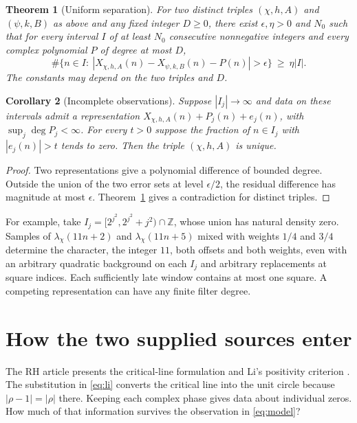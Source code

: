 \documentclass[11pt]{article}
\newtheorem{theorem}{Theorem}
\newtheorem{corollary}[theorem]{Corollary}
\newcommand{\model}{X_{\chi,h,A}}
\begin{document}
\begin{theorem}[Uniform separation]\label{thm:main}
For two distinct triples $(\chi,h,A)$ and $(\psi,k,B)$ as above and any fixed integer $D\ge0$, there exist $\epsilon,\eta>0$ and $N_0$ such that for every interval $I$ of at least $N_0$ consecutive nonnegative integers and every complex polynomial $P$ of degree at most $D$,
\[
 \#\{n\in I:\ |X_{\chi,h,A}(n)-X_{\psi,k,B}(n)-P(n)|>\epsilon\}
 \ \ge\ \eta |I|.
\]
The constants may depend on the two triples and $D$.
\end{theorem}

\begin{corollary}[Incomplete observations]\label{cor:id}
Suppose $|I_j|\to\infty$ and data on these intervals admit a representation $\model(n)+P_j(n)+e_j(n)$, with $\sup_j\deg P_j<\infty$. For every $t>0$ suppose the fraction of $n\in I_j$ with $|e_j(n)|>t$ tends to zero. Then the triple $(\chi,h,A)$ is unique.
\end{corollary}
\begin{proof}
Two representations give a polynomial difference of bounded degree. Outside the union of the two error sets at level $\epsilon/2$, the residual difference has magnitude at most $\epsilon$. Theorem~\ref{thm:main} gives a contradiction for distinct triples.
\end{proof}
For example, take $I_j=[2^{j^2},2^{j^2}+j^2)\cap\mathbb Z$, whose union has natural density zero. Samples of $\lambda_\chi(11n+2)$ and $\lambda_\chi(11n+5)$ mixed with weights $1/4$ and $3/4$ determine the character, the integer $11$, both offsets and both weights, even with an arbitrary quadratic background on each $I_j$ and arbitrary replacements at square indices. Each sufficiently late window contains at most one square. A competing representation can have any finite filter degree.

\section{How the two supplied sources enter}
The RH article \cite{wiki} presents the critical-line formulation and Li's positivity criterion \cite{li}. The substitution in \eqref{eq:li} converts the critical line into the unit circle because $|\rho-1|=|\rho|$ there. Keeping each complex phase gives data about individual zeros. How much of that information survives the observation in \eqref{eq:model}?
\end{document}
